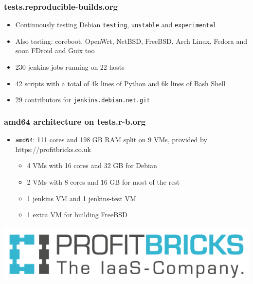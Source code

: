 \documentclass[14pt]{beamer}
\begin{document}
\begin{frame}
 \frametitle{tests.reproducible-builds.org}

 \begin{itemize}
  \item Continuously testing Debian \texttt{testing}, \texttt{unstable} and
  \texttt{experimental}
  \item Also testing: coreboot, OpenWrt, NetBSD, FreeBSD,
  Arch Linux, Fedora and soon FDroid and Guix too
  \item<2> 230 jenkins jobs running on 22 hosts
  \item<2> 42 scripts with a total of 4k lines of Python and 6k lines of Bash
  Shell
  \item<2> 29 contributors for \texttt{jenkins.debian.net.git}
 \end{itemize}
\end{frame}


\begin{frame}
 \frametitle{amd64 architecture on tests.r-b.org}

 \begin{itemize}
  \item \texttt{amd64}: 111 cores and 198 GB RAM split on 9 VMs, provided by
  https://profitbricks.co.uk
  \begin{itemize}
   \item 4 VMs with 16 cores and 32 GB for Debian
   \item 2 VMs with 8 cores and 16 GB for most of the rest
   \item 1 jenkins VM and 1 jenkins-test VM
   \item 1 extra VM for building FreeBSD
 \end{itemize}
 \end{itemize}
 \begin{center}
  \includegraphics[height=0.2\paperheight]{images/profitbricks_logo.png}
  \vfill
 \end{center}
\end{frame}
\end{document}
